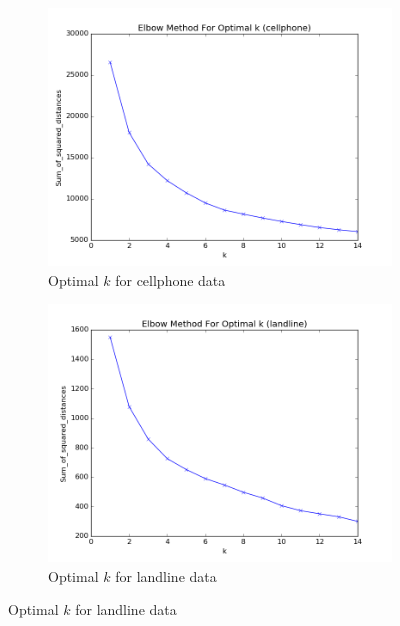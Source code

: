 \documentclass[20pt]{article} %
\begin{document}
\begin{figure}[!htbp]
  	\centering
   	\begin{subfigure}[p]{0.45\linewidth}
    	\includegraphics[width=\linewidth]{../figures/redo/cellphone/cp_optimal_k.png}
	\caption{Optimal $k$ for cellphone data}
   	\end{subfigure}
   	\begin{subfigure}[p]{0.45\linewidth}
    	\includegraphics[width=\linewidth]{../figures/redo/landline/ll_optimal_k.png}
	\caption{Optimal $k$ for landline data}
   	\end{subfigure}
\end{figure} 
\end{document}

